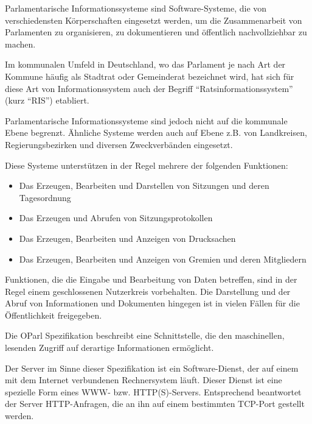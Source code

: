 \documentclass[,a4paper]{article}
\begin{document}
Parlamentarische Informationssysteme sind Software-Systeme, die von
verschiedensten Körperschaften eingesetzt werden, um die Zusammenarbeit
von Parlamenten zu organisieren, zu dokumentieren und öffentlich
nachvollziehbar zu machen.

Im kommunalen Umfeld in Deutschland, wo das Parlament je nach Art der
Kommune häufig als Stadtrat oder Gemeinderat bezeichnet wird, hat sich
für diese Art von Informationssystem auch der Begriff
``Ratsinformationssystem'' (kurz ``RIS'') etabliert.

Parlamentarische Informationssysteme sind jedoch nicht auf die kommunale
Ebene begrenzt. Ähnliche Systeme werden auch auf Ebene z.B. von
Landkreisen, Regierungsbezirken und diversen Zweckverbänden eingesetzt.

Diese Systeme unterstützen in der Regel mehrere der folgenden
Funktionen:

\begin{itemize}
\itemsep1pt\parskip0pt
\item
  Das Erzeugen, Bearbeiten und Darstellen von Sitzungen und deren
  Tagesordnung
\item
  Das Erzeugen und Abrufen von Sitzungsprotokollen
\item
  Das Erzeugen, Bearbeiten und Anzeigen von Drucksachen
\item
  Das Erzeugen, Bearbeiten und Anzeigen von Gremien und deren
  Mitgliedern
\end{itemize}

Funktionen, die die Eingabe und Bearbeitung von Daten betreffen, sind in
der Regel einem geschlossenen Nutzerkreis vorbehalten. Die Darstellung
und der Abruf von Informationen und Dokumenten hingegen ist in vielen
Fällen für die Öffentlichkeit freigegeben.

Die OParl Spezifikation beschreibt eine Schnittstelle, die den
maschinellen, lesenden Zugriff auf derartige Informationen ermöglicht.


Der Server im Sinne dieser Spezifikation ist ein Software-Dienst, der
auf einem mit dem Internet verbundenen Rechnersystem läuft. Dieser
Dienst ist eine spezielle Form eines WWW- bzw. HTTP(S)-Servers.
Entsprechend beantwortet der Server HTTP-Anfragen, die an ihn auf einem
bestimmten TCP-Port gestellt werden.
\end{document}
